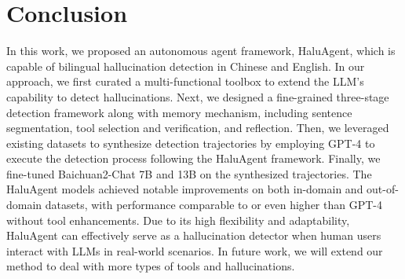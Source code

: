 \section{Conclusion}
In this work, we proposed an autonomous agent framework, HaluAgent, which is capable of bilingual hallucination detection in Chinese and English. In our approach, we first curated a multi-functional toolbox to extend the LLM’s capability to detect hallucinations. Next, we designed a fine-grained three-stage detection framework along with memory mechanism, including sentence segmentation, tool selection and verification, and reflection.
Then, we leveraged existing datasets to synthesize detection trajectories by employing GPT-4 to execute the detection process following the HaluAgent framework.
Finally, we fine-tuned Baichuan2-Chat 7B and 13B on the synthesized trajectories. The HaluAgent models achieved notable improvements on both in-domain and out-of-domain datasets, with performance comparable to or even higher than GPT-4 without tool enhancements. 
Due to its high flexibility and adaptability, HaluAgent can effectively serve as a hallucination detector when human users interact with LLMs in real-world scenarios. In future work, we will extend our method to deal with more types of tools and hallucinations.